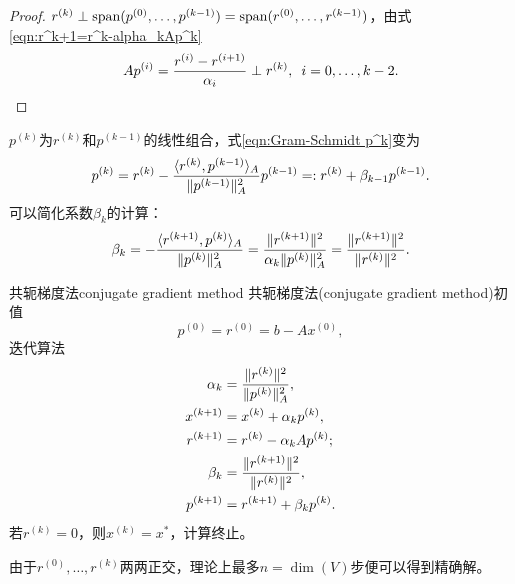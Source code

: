 \begin{proof}
    $r^{(k)} \perp \operatorname{span}(p^{(0)},\ldots,p^{(k-1)}) = \operatorname{span}(r^{(0)},\ldots,r^{(k-1)})$，由式\eqref{eqn:r^k+1=r^k-alpha_kAp^k}
    \[
        Ap^{(i)} = \frac{r^{(i)} - r^{(i+1)}}{\alpha_i} \perp r^{(k)},\enspace i = 0,\ldots,k - 2.
        \qedhere
    \]
\end{proof}

\begin{corollary}
    $p^{(k)}$为$r^{(k)}$和$p^{(k-1)}$的线性组合，式\eqref{eqn:Gram-Schmidt p^k}变为
    \[
        p^{(k)} = r^{(k)} - \frac{\langle r^{(k)},p^{(k-1)}\rangle_A}{\lVert p^{(k-1)}\rVert_A^2}p^{(k-1)} =: r^{(k)} + \beta_{k-1}p^{(k-1)}.
    \]
    可以简化系数$\beta_k$的计算：
    \begin{equation}\label{eq:na-conjugate-gradient-beta}
        \beta_k = -\frac{\langle r^{(k+1)},p^{(k)}\rangle_A}{\lVert p^{(k)}\rVert_A^2} = \frac{\lVert r^{(k+1)}\rVert^2}{\alpha_k\lVert p^{(k)}\rVert_A^2} = \frac{\lVert r^{(k+1)}\rVert^2}{\lVert r^{(k)}\rVert^2}.
    \end{equation}
\end{corollary}

\begin{theorem}
    {共轭梯度法}{conjugate gradient method}
    共轭梯度法(conjugate gradient method)初值
    \begin{equation}
        p^{(0)} = r^{(0)} = b - Ax^{(0)},
    \end{equation}
    迭代算法
    \begin{subequations}
        \begin{align}
            \alpha_k &= \frac{\lVert r^{(k)}\rVert^2}{\lVert p^{(k)}\rVert_A^2},\\
            x^{(k+1)} &= x^{(k)} + \alpha_kp^{(k)},\\
            r^{(k+1)} &= r^{(k)} - \alpha_kAp^{(k)};\\
            \beta_k &= \frac{\lVert r^{(k+1)}\rVert^2}{\lVert r^{(k)}\rVert^2},\\
            p^{(k+1)} &= r^{(k+1)} + \beta_kp^{(k)}.
        \end{align}
    \end{subequations}
    若$r^{(k)} = 0$，则$x^{(k)} = x^*$，计算终止。
\end{theorem}

\begin{corollary}
    由于$r^{(0)},\ldots,r^{(k)}$两两正交，理论上最多$n = \dim(V)$步便可以得到精确解。
\end{corollary}

